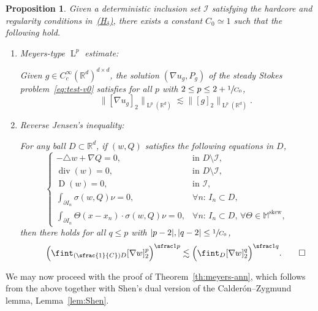 \documentclass[10pt]{amsart}
\let\mathcal\mathscr
\newcommand{\Hd}{\hyperref[Hd]{\textup{(H$_\delta$)}}\xspace}
\newcommand{\Psfrac}[2]{(\sfrac{#1}{#2})}
\theoremstyle{plain}
\newtheorem{propo}[theor]{Proposition}
\theoremstyle{definition}
\newcommand{\R}{\mathbb R}
\newcommand{\Ic}{\mathcal I}
\newcommand{\Md}{\mathbb M}
\newcommand{\D}{\operatorname{D}}
\newcommand{\Ld}{\operatorname{L}}
\newcommand{\Div}{{\operatorname{div}}}
\newcommand{\Skew}{{\operatorname{skew}}}
\begin{document}
\begin{propo}\label{prop:Meyers}
Given a deterministic inclusion set $\Ic$ satisfying the hardcore and regularity conditions in~\Hd,
there exists a constant $C_0\simeq1$ such that the following hold.
\begin{enumerate}\renewcommand{\theenumi}{\roman{enumi}}
\item\label{prop:Meyersi} \emph{Meyers-type $\Ld^p$ estimate:}
\par\noindent
Given $g\in C^\infty_c(\R^d)^{d\times d}$, the solution $(\nabla u_g,P_g)$ of the steady Stokes problem~\eqref{eq:test-v0}
satisfies for all $p$ with $2\le p\le2+\sfrac1{C_0}$,
\[\qquad\|[\nabla u_g]_2\|_{\Ld^p(\R^d)}\lesssim \|[g]_2\|_{\Ld^p(\R^d)}.\]
\item\label{prop:Meyersii} \emph{Reverse Jensen's inequality:}
\par\noindent
For any ball $D\subset\R^d$, if $(w,Q)$ satisfies the following equations in $D$,
\begin{equation*}
\begin{cases}
-\triangle w+\nabla Q=0,&\text{in $D\setminus\Ic$},\\
\Div(w)=0,&\text{in $D\setminus\Ic$},\\
\D(w)=0,&\text{in $\Ic$},\\
\int_{\partial I_{n}}\sigma(w,Q)\nu=0,&\forall n:\,I_{n}\subset D,\\
\int_{\partial I_{n}}\Theta(x-x_n)\cdot\sigma(w,Q)\nu=0,&\forall n:\,I_{n}\subset D,\,\forall\Theta\in\Md^\Skew,
\end{cases}
\end{equation*}
then there holds for all $q\le p$ with $|p-2|,|q-2|\le\sfrac1{C_0}$,
\[\qquad\Big(\fint_{\Psfrac1CD}[\nabla w]_2^p\Big)^{\sfrac1p}\lesssim \Big(\fint_{D}[\nabla w]_2^q\Big)^{\sfrac1q}.\qedhere\]
\end{enumerate}
\end{propo}

We may now proceed with the proof of Theorem~\ref{th:meyers-ann}, which follows from the above together with Shen's dual version of the Calderón--Zygmund lemma, \cf Lemma~\ref{lem:Shen}.
\end{document}
